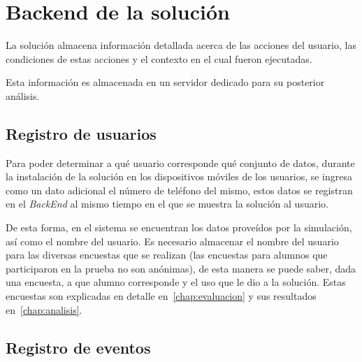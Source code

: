 \section{Backend de la solución}

La solución almacena información detallada acerca de las acciones del usuario,
las condiciones de estas acciones y el contexto en el cual fueron ejecutadas.

Esta información es almacenada en un servidor dedicado para su posterior
análisis.



\subsection{Registro de usuarios}

Para poder determinar a qué usuario corresponde qué conjunto de datos, durante la
instalación de la solución en los dispositivos móviles de los usuarios, se ingresa como
un dato adicional el número de teléfono del mismo, estos datos se registran
en el \textit{BackEnd} al mismo tiempo en el que se muestra la solución al usuario.

De esta forma, en el sistema se encuentran los datos proveídos por la
simulación, así como el nombre del usuario. Es necesario almacenar el nombre del
usuario para las diversas encuestas que se realizan (las encuestas para alumnos
que participaron en la prueba no son anónimas), de esta manera se puede
saber, dada una encuesta, a que alumno corresponde y el uso que le dio a la
solución. Estas encuestas son explicadas en detalle en~\ref{chap:evaluacion} y sus 
resultados en~\ref{chap:analisis}.

\subsection{Registro de eventos}
\label{sec:backend_reg_eventos}

